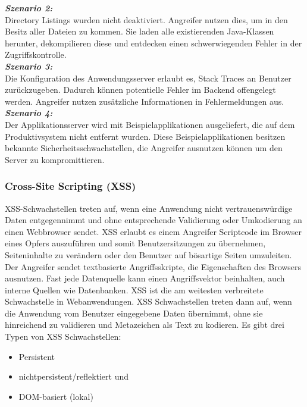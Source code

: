 \textbf{\textit{Szenario 2:}}\\
Directory Listings wurden nicht deaktiviert.
Angreifer nutzen dies, um in den Besitz aller Dateien zu
kommen. Sie laden alle existierenden Java-Klassen herunter,
dekompilieren diese und entdecken einen schwerwiegenden
Fehler in der Zugriffskontrolle\cite[12]{owasp17top10}.\\

\textbf{\textit{Szenario 3:}}\\
Die Konfiguration des Anwendungsserver erlaubt
es, Stack Traces an Benutzer zurückzugeben. Dadurch können
potentielle Fehler im Backend offengelegt werden. Angreifer
nutzen zusätzliche Informationen in Fehlermeldungen aus\cite[12]{owasp17top10}.\\

\textbf{\textit{Szenario 4:}}\\
Der Applikationsserver wird mit Beispielapplikationen
ausgeliefert, die auf dem Produktivsystem nicht
entfernt wurden. Diese Beispielapplikationen besitzen
bekannte Sicherheitsschwachstellen, die Angreifer ausnutzen
können um den Server zu kompromittieren\cite[12]{owasp17top10}.

\subsubsection{Cross-Site Scripting (XSS)}

XSS-Schwachstellen treten auf, wenn eine Anwendung nicht vertrauenswürdige Daten entgegennimmt und ohne entsprechende Validierung oder Umkodierung an einen Webbrowser sendet. XSS erlaubt es einem Angreifer Scriptcode im Browser eines Opfers auszuführen und somit Benutzersitzungen zu übernehmen, Seiteninhalte zu verändern oder den Benutzer auf bösartige
Seiten umzuleiten\cite[6]{owasp17top10}. Der Angreifer sendet textbasierte Angriffsskripte, die Eigenschaften des Browsers ausnutzen. Fast jede Datenquelle kann einen Angriffsvektor beinhalten, auch interne Quellen wie Datenbanken. XSS ist die am weitesten verbreitete Schwachstelle in Webanwendungen. XSS Schwachstellen treten dann auf, wenn die Anwendung vom Benutzer eingegebene Daten übernimmt, ohne sie hinreichend zu validieren und Metazeichen als Text zu kodieren. Es gibt drei Typen von XSS Schwachstellen:
\begin{itemize}
	\item Persistent
	\item nichtpersistent/reflektiert und
	\item DOM-basiert (lokal)
\end{itemize}

